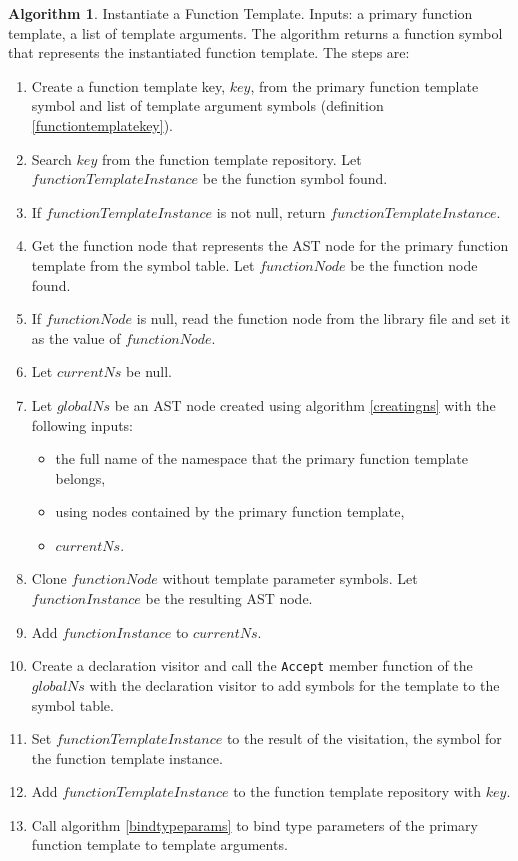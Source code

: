 \documentclass[a4paper,oneside,11pt]{book}
\theoremstyle{definition}
\newtheorem{algo}{Algorithm}[section]
\begin{document}
\begin{algo}\label{instantiatefunctiontemplate} Instantiate a Function Template. Inputs: a primary function template, a list of template arguments.
The algorithm returns a function symbol that represents the instantiated function template.
The steps are:
\begin{enumerate}
\item
Create a function template key, $key$, from the primary function template symbol and list of template argument symbols (definition \ref{functiontemplatekey}).
\item
Search $key$ from the function template repository. Let $functionTemplateInstance$ be the function symbol found.
\item
If $functionTemplateInstance$ is not null, return $functionTemplateInstance$.
\item
Get the function node that represents the AST node for the primary function template from the symbol table. Let $functionNode$ be the function node found.
\item
If $functionNode$ is null, read the function node from the library file and set it as the value of $functionNode$.
\item
Let $currentNs$ be null.
\item
Let $globalNs$ be an AST node created using algorithm \ref{creatingns} with the following inputs:
\begin{itemize}
\item
the full name of the namespace that the primary function template belongs,
\item
using nodes contained by the primary function template,
\item
$currentNs$.
\end{itemize}
\item
Clone $functionNode$ without template parameter symbols. Let $functionInstance$ be the resulting AST node.
\item
Add $functionInstance$ to $currentNs$.
\item
Create a declaration visitor and call the \verb|Accept| member function of the $globalNs$
with the declaration visitor to add symbols for the template to the symbol table.
\item
Set $functionTemplateInstance$ to the result of the visitation, the symbol for the function template instance.
\item
Add $functionTemplateInstance$ to the function template repository with $key$.
\item
Call algorithm \ref{bindtypeparams} to bind type parameters of the primary function template to template arguments.

\end{enumerate}
\end{algo}
\end{document}
